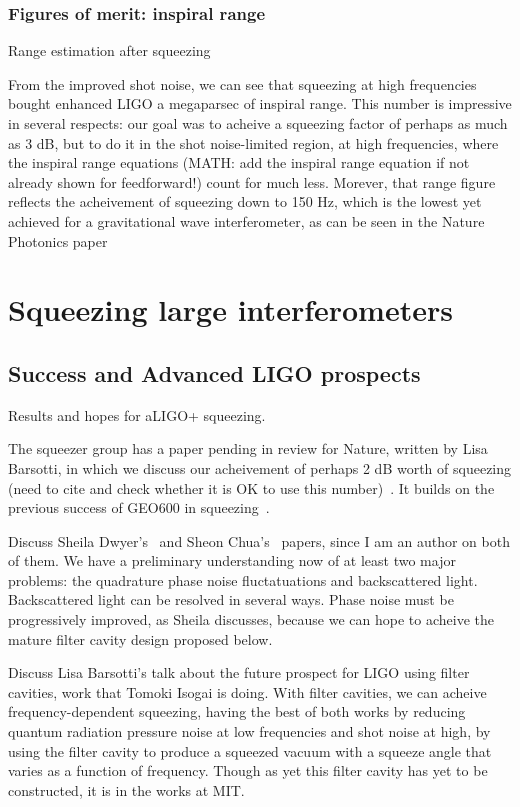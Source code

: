             \subsubsection{Figures of merit: inspiral range}
            \label{range_est}

                Range estimation after squeezing

		From the improved shot noise, we can see that squeezing at high frequencies bought enhanced LIGO a megaparsec of inspiral range. This number is impressive in several respects: our goal was to acheive a squeezing factor of perhaps as much as 3 dB, but to do it in the shot noise-limited region, at high frequencies, where the inspiral range equations (MATH: add the inspiral range equation if not already shown for feedforward!) count for much less. Morever, that range figure reflects the acheivement of squeezing down to 150 Hz, which is the lowest yet achieved for a gravitational wave interferometer, as can be seen in the Nature Photonics paper~\cite{BarsottiNatureSqueezing}


\section{Squeezing large interferometers}

        \subsection{Success and Advanced LIGO prospects}
        \label{squeezing_success}
            Results and hopes for aLIGO+ squeezing.

	    The squeezer group has a paper pending in review for Nature, written by Lisa Barsotti, in which we discuss our acheivement of perhaps 2 dB worth of squeezing (need to cite and check whether it is OK to use this number)~\cite{BarsottiNatureSqueezing}. It builds on the previous success of GEO600 in squeezing~\cite{GEO600NatureSqueezing}.

	    Discuss Sheila Dwyer's~\cite{DwyerPhaseNoise} and Sheon Chua's~\cite{ChuaBackscatteredLight} papers, since I am an author on both of them. We have a preliminary understanding now of at least two major problems: the quadrature phase noise fluctatuations and backscattered light. Backscattered light can be resolved in several ways. Phase noise must be progressively improved, as Sheila discusses, because we can hope to acheive the mature filter cavity design proposed below.

Discuss Lisa Barsotti's talk about the future prospect for LIGO using filter cavities, work that Tomoki Isogai is doing. With filter cavities, we can acheive frequency-dependent squeezing, having the best of both works by reducing quantum radiation pressure noise at low frequencies and shot noise at high, by using the filter cavity to produce a squeezed vacuum with a squeeze angle that varies as a function of frequency. Though as yet this filter cavity has yet to be constructed, it is in the works at MIT.

